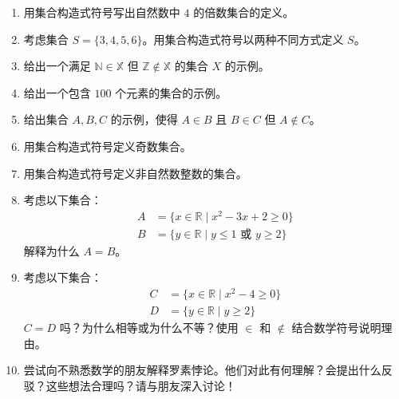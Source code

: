 \begin{enumerate}[label=(\arabic*)]
    \item 用集合构造式符号写出自然数中 $4$ 的倍数集合的定义。
    \item 考虑集合 $S = \{3, 4, 5, 6\}$。用集合构造式符号以两种不同方式定义 $S$。
    \item 给出一个满足 $\mathbb{N} \in \mathbb{X}$ 但 $\mathbb{Z} \notin \mathbb{X}$ 的集合 $X$ 的示例。
    \item 给出一个包含 $100$ 个元素的集合的示例。
    \item 给出集合 $A, B, C$ 的示例，使得 $A \in B$ 且 $B \in C$ 但 $A \notin C$。
    \item 用集合构造式符号定义奇数集合。
    \item 用集合构造式符号定义非自然数整数的集合。
    \item 考虑以下集合：
        \begin{align*}
            A &= \{x \in \mathbb{R} \mid x^2 - 3x + 2 \ge 0\} \\
            B &= \{y \in \mathbb{R} \mid y \le 1 \text{\ 或\ } y \ge 2\}
        \end{align*}
        解释为什么 $A=B$。
    \item 考虑以下集合：
        \begin{align*}
            C &= \{x \in \mathbb{R} \mid x^2 - 4 \ge 0\} \\
            D &= \{y \in \mathbb{R} \mid y \ge 2\}
        \end{align*}
        $C = D$ 吗？为什么相等或为什么不等？使用 $\in$ 和 $\notin$ 结合数学符号说明理由。
    \item 尝试向不熟悉数学的朋友解释罗素悖论。他们对此有何理解？会提出什么反驳？这些想法合理吗？请与朋友深入讨论！
\end{enumerate}
